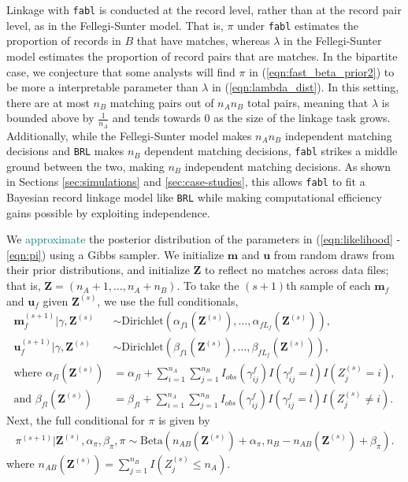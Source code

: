 \documentclass[ba]{imsart}
\begin{document}
\begin{remark}
Linkage with \texttt{fabl} is conducted at the record level, rather than at the record pair level, as in the Fellegi-Sunter model. That is, $\pi$ under \texttt{fabl} estimates the proportion of records in $B$ that have matches, whereas $\lambda$ in the Fellegi-Sunter model estimates the proportion of record pairs that are matches. In the bipartite case, we conjecture that some analysts will find $\pi$ in (\ref{eqn:fast_beta_prior2}) to be more a interpretable parameter than $\lambda$ in (\ref{eqn:lambda_dist}). In this setting, there are at most $n_B$ matching pairs out of $n_A n_B$ total pairs, meaning that $\lambda$ is bounded above by $\frac{1}{n_A}$ and tends towards 0 as the size of the linkage task grows. Additionally, while the Fellegi-Sunter model makes $n_A  n_B$ independent matching decisions and \texttt{BRL} makes $n_B$ dependent matching decisions, \texttt{fabl} strikes a middle ground between the two, making $n_B$  independent matching decisions. As shown in Sections \ref{sec:simulations} and \ref{sec:case-studies}, this allows \texttt{fabl} to fit a Bayesian record linkage model like \texttt{BRL} while making computational efficiency gains possible by exploiting independence. 
\end{remark}






We \textcolor{teal}{approximate} the posterior distribution of the parameters in (\ref{eqn:likelihood} - \ref{eqn:pi}) using a Gibbs sampler. 
We initialize $\bm{m}$ and $\bm{u}$ from random draws from their prior distributions, and initialize $\bm{Z}$ to reflect no matches across data files; that is, $\bm{Z} = (n_A + 1, \ldots, n_A + n_B)$. To take the $(s+1)$th sample of each $\bm{m}_f$ and $\bm{u}_f$ given $\bm{Z}^{(s)}$, we use the full conditionals,
\begin{subequations}
\begin{align}
	\bm{m}_f^{(s+1)}|\gamma, \bm{Z}^{(s)} &\sim \text{Dirichlet}(\alpha_{f1}(\bm{Z}^{(s)}), \ldots, \alpha_{fL_f}(\bm{Z}^{(s)})), \label{eqn:m_update} \\
	\bm{u}_f^{(s+1)}|\gamma, \bm{Z}^{(s)} &\sim \text{Dirichlet}(\beta_{f1}(\bm{Z}^{(s)}), \ldots, \beta_{fL_f}(\bm{Z}^{(s)})), \label{eqn:u_update} \\
	\text{where }\alpha_{fl}(\bm{Z}^{(s)})&= \alpha_{fl} + \sum_{i=1}^{n_A}\sum_{j=1}^{n_B} I_{obs}(\gamma_{ij}^f) I(\gamma_{ij}^f = l) I(Z_j^{(s)} = i), \label{eqn:alpha_update} \\
	\text{and } \beta_{fl}(\bm{Z}^{(s)})&=  \beta_{fl} + \sum_{i=1}^{n_A}\sum_{j=1}^{n_B}  I_{obs}(\gamma_{ij}^f) I(\gamma_{ij}^f = l) I(Z_j^{(s)} \neq i) \label{eqn:beta_update}.
\end{align}
\end{subequations}
Next, the full conditional for $\pi$ is given by
\begin{align}
	\pi^{(s+1)}|\bm{Z}^{(s)},  \alpha_{\pi}, \beta_{\pi}, \pi \sim  \text{Beta}(n_{AB}(\bm{Z}^{(s)}) + \alpha_{\pi}, n_B - n_{AB}(\bm{Z}^{(s)}) + \beta_{\pi}).
\end{align}
where $n_{AB}(\bm{Z}^{(s)}) = \sum_{j=1}^{n_B} I(Z_j^{(s)} \leq n_A)$.
\end{document}
